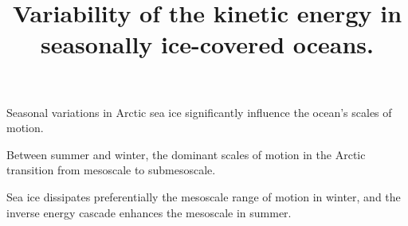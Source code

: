 \documentclass[draft]{agujournal2019}
\begin{document}
%
%


\title{Variability of the kinetic energy in seasonally ice-covered oceans.}

%
%





\begin{keypoints}
\item Seasonal variations in Arctic sea ice significantly influence the ocean's scales of motion.
\item Between summer and winter, the dominant scales of motion in the Arctic transition from mesoscale to submesoscale. 
\item Sea ice dissipates preferentially the mesoscale range of motion in winter, and the inverse energy cascade enhances the mesoscale in summer.
\end{keypoints}
\end{document}
